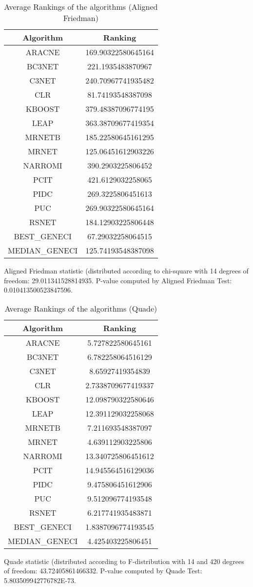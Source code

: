 \documentclass[a4paper,10pt]{article}
\begin{document}
\begin{landscape}
\begin{table}[!htp]
\centering
\caption{Average Rankings of the algorithms (Aligned Friedman)
}\begin{tabular}{c|c}
Algorithm&Ranking\\
\hline
ARACNE&169.90322580645164\\
BC3NET&221.1935483870967\\
C3NET&240.70967741935482\\
CLR&81.74193548387098\\
KBOOST&379.48387096774195\\
LEAP&363.38709677419354\\
MRNETB&185.22580645161295\\
MRNET&125.06451612903226\\
NARROMI&390.2903225806452\\
PCIT&421.6129032258065\\
PIDC&269.3225806451613\\
PUC&269.90322580645164\\
RSNET&184.12903225806448\\
BEST_GENECI&67.29032258064515\\
MEDIAN_GENECI&125.74193548387098\\
\end{tabular}
\end{table}


Aligned Friedman statistic (distributed according to chi-square with 14 degrees of freedom: 29.011341528814935. 
P-value computed by Aligned Friedman Test: 0.010413500523847596.\newline


\newpage

\begin{table}[!htp]
\centering
\caption{Average Rankings of the algorithms (Quade)
}\begin{tabular}{c|c}
Algorithm&Ranking\\
\hline
ARACNE&5.727822580645161\\
BC3NET&6.782258064516129\\
C3NET&8.65927419354839\\
CLR&2.7338709677419337\\
KBOOST&12.098790322580646\\
LEAP&12.391129032258068\\
MRNETB&7.211693548387097\\
MRNET&4.639112903225806\\
NARROMI&13.340725806451612\\
PCIT&14.945564516129036\\
PIDC&9.475806451612906\\
PUC&9.512096774193548\\
RSNET&6.217741935483871\\
BEST_GENECI&1.8387096774193545\\
MEDIAN_GENECI&4.425403225806451\\
\end{tabular}
\end{table}
Quade statistic (distributed according to F-distribution with 14 and 420 degrees of freedom: 43.72405861466332. 
P-value computed by Quade Test: 5.803509942776782E-73.\newline



\end{landscape}
\end{document}
